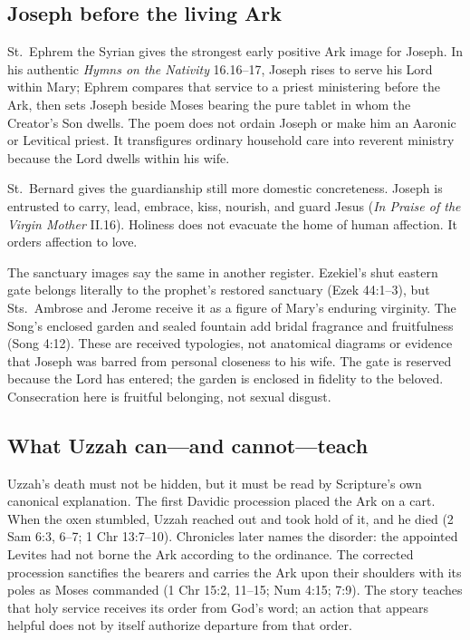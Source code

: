 \subsection{Joseph before the living Ark}

St.~Ephrem the Syrian gives the strongest early positive Ark image for
Joseph.  In his authentic \emph{Hymns on the Nativity} 16.16--17, Joseph rises
to serve his Lord within Mary; Ephrem compares that service to a priest
ministering before the Ark, then sets Joseph beside Moses bearing the pure
tablet in whom the Creator's Son dwells.  The poem does not ordain
Joseph or make him an Aaronic or Levitical priest.  It transfigures ordinary
household care into reverent ministry because the Lord dwells within his wife.

St.~Bernard gives the guardianship still more domestic concreteness.  Joseph is
entrusted to carry, lead, embrace, kiss, nourish, and guard Jesus
(\emph{In Praise of the Virgin Mother} II.16).  Holiness does not evacuate the
home of human affection.  It orders affection to love.

The sanctuary images say the same in another register.  Ezekiel's shut eastern
gate belongs literally to the prophet's restored sanctuary (Ezek 44:1--3), but
Sts.~Ambrose and Jerome receive it as a figure of Mary's enduring virginity.
The Song's enclosed garden and sealed fountain add bridal fragrance and
fruitfulness (Song 4:12).  These are received typologies, not anatomical
diagrams or evidence that Joseph was barred from personal closeness to his
wife.  The gate is reserved because the Lord has entered; the garden is
enclosed in fidelity to the beloved.  Consecration here is fruitful belonging,
not sexual disgust.

\subsection{What Uzzah can---and cannot---teach}

Uzzah's death must not be hidden, but it must be read by Scripture's own
canonical explanation.  The first Davidic procession placed the Ark on a
cart.  When the oxen stumbled, Uzzah reached out and took hold of it, and he
died (2 Sam 6:3, 6--7; 1 Chr 13:7--10).  Chronicles later names the disorder:
the appointed Levites had not borne the Ark according to the ordinance.  The
corrected procession sanctifies the bearers and carries the Ark upon their
shoulders with its poles as Moses commanded (1 Chr 15:2, 11--15; Num 4:15;
7:9).  The story teaches that holy service receives its order from God's word;
an action that appears helpful does not by itself authorize departure from
that order.

